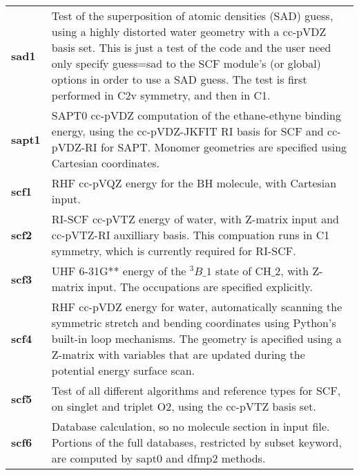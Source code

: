 \begin{tabular*}{\textwidth}[tb]{p{}p{}}
{\bf sad1} &  Test of the superposition of atomic densities (SAD) guess, using a highly distorted water geometry with a cc-pVDZ basis set.  This is just a test of the code and the user need only specify guess=sad to the SCF module's (or global) options in order to use a SAD guess. The test is first performed in C2v symmetry, and then in C1.\\
{\bf sapt1} &  SAPT0 cc-pVDZ computation of the ethane-ethyne binding energy, using the cc-pVDZ-JKFIT RI basis for SCF and cc-pVDZ-RI for SAPT.  Monomer geometries are specified using Cartesian coordinates.\\
{\bf scf1} &  RHF cc-pVQZ energy for the BH molecule, with Cartesian input.\\
{\bf scf2} &  RI-SCF cc-pVTZ energy of water, with Z-matrix input and cc-pVTZ-RI auxilliary basis. This compuation runs in C1 symmetry, which is currently required for RI-SCF.\\
{\bf scf3} &  UHF 6-31G** energy of the $^3B\_1$ state of CH$\_2$, with Z-matrix input. The occupations are specified explicitly.\\
{\bf scf4} &  RHF cc-pVDZ energy for water, automatically scanning the symmetric stretch and bending coordinates using Python's built-in loop mechanisms.  The geometry is apecified using a Z-matrix with variables that are updated during the potential energy surface scan.\\
{\bf scf5} &  Test of all different algorithms and reference types for SCF, on singlet and triplet O2, using the cc-pVTZ basis set.\\
{\bf scf6} &  Database calculation, so no molecule section in input file. Portions of the full databases, restricted by subset keyword, are computed by sapt0 and dfmp2 methods.\\
\end{tabular*}
